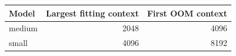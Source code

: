 \begin{tabular}{lrr}
\toprule
Model & Largest fitting context & First OOM context \\
\midrule
medium & 2048 & 4096 \\
small & 4096 & 8192 \\
\bottomrule
\end{tabular}
